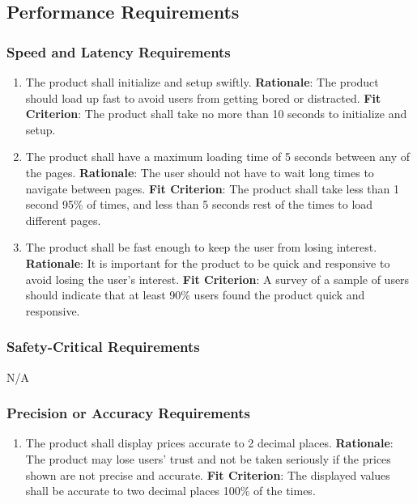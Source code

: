 \documentclass[12pt, titlepage]{article}
\begin{document}
\subsection{Performance Requirements}
\subsubsection{Speed and Latency Requirements}
\begin{enumerate}[nfr]
    \item The product shall initialize and setup swiftly.
    \newline \textbf{Rationale}: The product should load up fast to avoid users from getting bored or distracted.
    \newline \textbf{Fit Criterion}: The product shall take no more than 10 seconds to initialize and setup.
    \item The product shall have a maximum loading time of 5 seconds between any of the pages.
    \newline \textbf{Rationale}: The user should not have to wait long times to navigate between pages.
    \newline \textbf{Fit Criterion}: The product shall take less than 1 second 95\% of times, and less than 5 seconds rest of the times to load different pages. 
    \item The product shall be fast enough to keep the user from losing interest.
    \newline \textbf{Rationale}: It is important for the product to be quick and responsive to avoid losing the user's interest.
    \newline \textbf{Fit Criterion}: A survey of a sample of users should indicate that at least 90\% users found the product quick and responsive.
\end{enumerate}

\subsubsection{Safety-Critical Requirements}
N/A
\subsubsection{Precision or Accuracy Requirements}
\begin{enumerate}[nfr]
    \item The product shall display prices accurate to 2 decimal places.
    \newline \textbf{Rationale}: The product may lose users' trust and not be taken seriously if the prices shown are not precise and accurate.
    \newline \textbf{Fit Criterion}: The displayed values shall be accurate to two decimal places 100\% of the times.
\end{enumerate}
\end{document}
